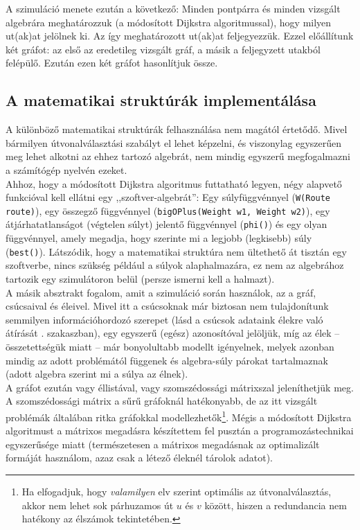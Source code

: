   A szimuláció menete ezután a következő: Minden pontpárra és minden vizsgált algebrára meghatározzuk (a módosított Dijkstra algoritmussal), hogy milyen ut(ak)at jelölnek ki. Az így meghatározott ut(ak)at feljegyezzük. Ezzel előállítunk két gráfot: az első az eredetileg vizsgált gráf, a másik a feljegyzett utakból felépülő. Ezután ezen két gráfot hasonlítjuk össze.

    \subsection{A matematikai struktúrák implementálása}
    A különböző matematikai struktúrák felhasználása nem magától értetődő. Mivel bármilyen útvonalválasztási szabályt el lehet képzelni, és viszonylag egyszerűen meg lehet alkotni az ehhez tartozó algebrát, nem mindig egyszerű megfogalmazni a számítógép nyelvén ezeket.\\
    Ahhoz, hogy a módosított Dijkstra algoritmus futtatható legyen, négy alapvető funkcióval kell ellátni egy ,,szoftver-algebrát'': Egy súlyfüggvénnyel (\texttt{W(Route route)}), egy összegző függvénnyel (\texttt{bigOPlus(Weight w1, Weight w2)}), egy átjárhatatlanságot (végtelen súlyt) jelentő függvénnyel (\texttt{phi()}) és egy olyan függvénnyel, amely megadja, hogy szerinte mi a legjobb (legkisebb) súly (\texttt{best()}). Látszódik, hogy a matematikai struktúra nem ültethető át tisztán egy szoftverbe, nincs szükség például a súlyok alaphalmazára, ez nem az algebrához tartozik egy szimulátoron belül (persze ismerni kell a halmazt).\\

    A másik absztrakt fogalom, amit a szimuláció során használok, az a gráf, csúcsaival és éleivel. Mivel itt a csúcsoknak már biztosan nem tulajdonítunk semmilyen információhordozó szerepet (lásd a csúcsok adataink élekre való átírását . szakaszban), egy egyszerű (egész) azonosítóval jelöljük, míg az élek -- összetettségük miatt -- már bonyolultabb modellt igényelnek, melyek azonban mindig az adott problémától függenek és algebra-súly párokat tartalmaznak (adott algebra szerint mi a súlya az élnek).\\
    A gráfot ezután vagy éllistával, vagy szomszédossági mátrixszal jeleníthetjük meg. A szomszédossági mátrix a sűrű gráfoknál hatékonyabb, de az itt vizsgált problémák általában ritka gráfokkal modellezhetők\footnote{Ha elfogadjuk, hogy \textit{valamilyen} elv szerint optimális az útvonalválasztás, akkor nem lehet sok párhuzamos út $u$ és $v$ között, hiszen a redundancia nem hatékony az élszámok tekintetében.}. Mégis a módosított Dijkstra algoritmust a mátrixos megadásra készítettem fel pusztán a programozástechnikai egyszerűsége miatt (természetesen a mátrixos megadásnak az optimalizált formáját használom, azaz csak a létező éleknél tárolok adatot).

